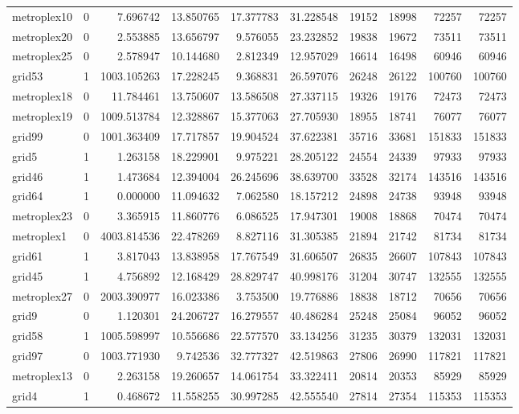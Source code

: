 \begin{longtable}{|l|r|r|r|r|r|r|r|r|r|}
metroplex10 & 0 & 7.696742 & 13.850765 & 17.377783 & 31.228548 & 19152 & 18998 & 72257 & 72257 \\
metroplex20 & 0 & 2.553885 & 13.656797 & 9.576055 & 23.232852 & 19838 & 19672 & 73511 & 73511 \\
metroplex25 & 0 & 2.578947 & 10.144680 & 2.812349 & 12.957029 & 16614 & 16498 & 60946 & 60946 \\
grid53 & 1 & 1003.105263 & 17.228245 & 9.368831 & 26.597076 & 26248 & 26122 & 100760 & 100760 \\
metroplex18 & 0 & 11.784461 & 13.750607 & 13.586508 & 27.337115 & 19326 & 19176 & 72473 & 72473 \\
metroplex19 & 0 & 1009.513784 & 12.328867 & 15.377063 & 27.705930 & 18955 & 18741 & 76077 & 76077 \\
grid99 & 0 & 1001.363409 & 17.717857 & 19.904524 & 37.622381 & 35716 & 33681 & 151833 & 151833 \\
grid5 & 1 & 1.263158 & 18.229901 & 9.975221 & 28.205122 & 24554 & 24339 & 97933 & 97933 \\
grid46 & 1 & 1.473684 & 12.394004 & 26.245696 & 38.639700 & 33528 & 32174 & 143516 & 143516 \\
grid64 & 1 & 0.000000 & 11.094632 & 7.062580 & 18.157212 & 24898 & 24738 & 93948 & 93948 \\
metroplex23 & 0 & 3.365915 & 11.860776 & 6.086525 & 17.947301 & 19008 & 18868 & 70474 & 70474 \\
metroplex1 & 0 & 4003.814536 & 22.478269 & 8.827116 & 31.305385 & 21894 & 21742 & 81734 & 81734 \\
grid61 & 1 & 3.817043 & 13.838958 & 17.767549 & 31.606507 & 26835 & 26607 & 107843 & 107843 \\
grid45 & 1 & 4.756892 & 12.168429 & 28.829747 & 40.998176 & 31204 & 30747 & 132555 & 132555 \\
metroplex27 & 0 & 2003.390977 & 16.023386 & 3.753500 & 19.776886 & 18838 & 18712 & 70656 & 70656 \\
grid9 & 0 & 1.120301 & 24.206727 & 16.279557 & 40.486284 & 25248 & 25084 & 96052 & 96052 \\
grid58 & 1 & 1005.598997 & 10.556686 & 22.577570 & 33.134256 & 31235 & 30379 & 132031 & 132031 \\
grid97 & 0 & 1003.771930 & 9.742536 & 32.777327 & 42.519863 & 27806 & 26990 & 117821 & 117821 \\
metroplex13 & 0 & 2.263158 & 19.260657 & 14.061754 & 33.322411 & 20814 & 20353 & 85929 & 85929 \\
grid4 & 1 & 0.468672 & 11.558255 & 30.997285 & 42.555540 & 27814 & 27354 & 115353 & 115353 \\

\end{longtable}
